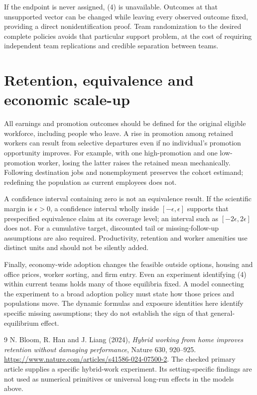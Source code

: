 \documentclass[11pt,a4paper]{article}
\begin{document}
If the endpoint is never assigned, (4) is unavailable. Outcomes at that unsupported vector can be changed while leaving every observed outcome fixed, providing a direct nonidentification proof. Team randomization to the desired complete policies avoids that particular support problem, at the cost of requiring independent team replications and credible separation between teams.

\section{Retention, equivalence and economic scale-up}
All earnings and promotion outcomes should be defined for the original eligible workforce, including people who leave. A rise in promotion among retained workers can result from selective departures even if no individual's promotion opportunity improves. For example, with one high-promotion and one low-promotion worker, losing the latter raises the retained mean mechanically. Following destination jobs and nonemployment preserves the cohort estimand; redefining the population as current employees does not.

A confidence interval containing zero is not an equivalence result. If the scientific margin is $\epsilon>0$, a confidence interval wholly inside $[-\epsilon,\epsilon]$ supports that prespecified equivalence claim at its coverage level; an interval such as $[-2\epsilon,2\epsilon]$ does not. For a cumulative target, discounted tail or missing-follow-up assumptions are also required. Productivity, retention and worker amenities use distinct units and should not be silently added.

Finally, economy-wide adoption changes the feasible outside options, housing and office prices, worker sorting, and firm entry. Even an experiment identifying (4) within current teams holds many of those equilibria fixed. A model connecting the experiment to a broad adoption policy must state how those prices and populations move. The dynamic formulas and exposure identities here identify specific missing assumptions; they do not establish the sign of that general-equilibrium effect.

\begin{thebibliography}{9}
 N. Bloom, R. Han and J. Liang (2024), \emph{Hybrid working from home improves retention without damaging performance}, Nature 630, 920--925. \url{https://www.nature.com/articles/s41586-024-07500-2}. The checked primary article supplies a specific hybrid-work experiment. Its setting-specific findings are not used as numerical primitives or universal long-run effects in the models above.
\end{thebibliography}
\end{document}
